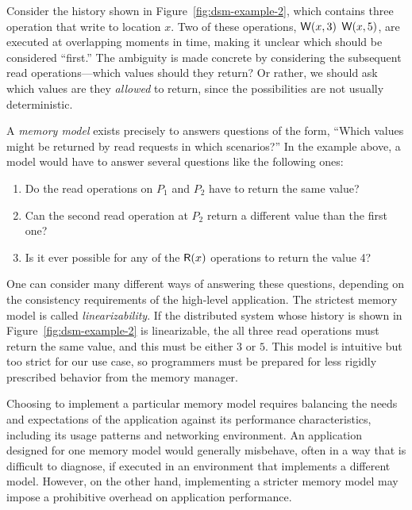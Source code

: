 \documentclass[]             %
{NASA}                       %
\theoremstyle{definition}
\newtheorem{example}[theorem]{Example}
\begin{document}

Consider the history shown in Figure~\ref{fig:dsm-example-2}, which
contains three operation that write to location $x$. Two of these
operations, $\mathsf{W}\!\left(x, 3\right)$ $\mathsf{W}\!\left(x, 5\right)$, are executed at
overlapping moments in time, making it unclear which should be
considered ``first.'' The ambiguity is made concrete by considering
the subsequent read operations---which values should they return? Or
rather, we should ask which values are they \emph{allowed} to return,
since the possibilities are not usually deterministic.

A \emph{memory model} exists precisely to answers questions of the
form, ``Which values might be returned by read requests in which
scenarios?'' In the example above, a model would have to answer
several questions like the following ones:
\begin{enumerate}
\item Do the read operations on $P_1$ and $P_2$ have to return the same value?
\item Can the second read operation at $P_2$ return a different value
  than the first one?
\item Is it ever possible for any of the $\mathsf{R}\!\left(x\right)$ operations to
  return the value 4?
\end{enumerate}

One can consider many different ways of answering these questions,
depending on the consistency requirements of the high-level
application. The strictest memory model is called
\emph{linearizability}. If the distributed
system whose history is shown in Figure~\ref{fig:dsm-example-2} is
linearizable, the all three read operations must return the same
value, and this must be either $3$ or $5$. This model is intuitive but
too strict for our use case, so programmers must be prepared for less
rigidly prescribed behavior from the memory manager.

Choosing to implement a particular memory model requires balancing the
needs and expectations of the application against its performance
characteristics, including its usage patterns and networking
environment. An application designed for one memory model would
generally misbehave, often in a way that is difficult to diagnose, if
executed in an environment that implements a different model. However,
on the other hand, implementing a stricter memory model may impose a
prohibitive overhead on application performance.
\end{document}
